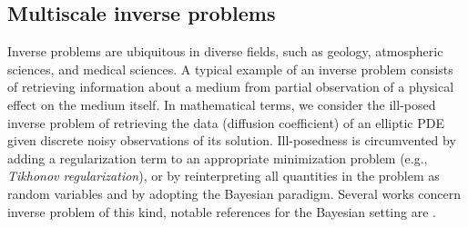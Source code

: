 \documentclass[10pt]{article}
\begin{document}
\subsection{Multiscale inverse problems}\label{sec:AndreaDB}

Inverse problems are ubiquitous in diverse fields, such as geology, atmospheric sciences, and medical sciences. A typical example of an inverse problem consists of retrieving information about a medium from partial observation of a physical effect on the medium itself. In mathematical terms, we consider the ill-posed inverse problem of retrieving the data (diffusion coefficient) of an elliptic PDE given discrete noisy observations of its solution. Ill-posedness is circumvented by adding a regularization term to an appropriate minimization problem (e.g., \textit{Tikhonov regularization}), or by reinterpreting all quantities in the problem as random variables and by adopting the Bayesian paradigm. Several works concern inverse problem of this kind, notable references for the Bayesian setting are \cite{CDS10,DaS16,Stu10}.
\end{document}
